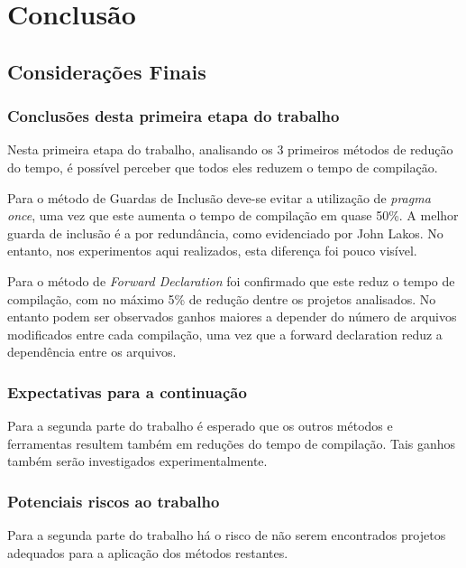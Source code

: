 \part{Conclusão}

\chapter[Considerações Finais]{Considerações Finais}

\section{Conclusões desta primeira etapa do trabalho}

Nesta primeira etapa do trabalho, analisando os 3 primeiros
 métodos de redução do tempo, é possível perceber que todos
 eles reduzem o tempo de compilação.

Para o método de Guardas de Inclusão deve-se evitar a
 utilização de \textit{pragma once}, uma vez que este aumenta
 o tempo de compilação em quase 50\%. A melhor guarda
 de inclusão é a por redundância, como evidenciado por
 John Lakos. No entanto, nos experimentos aqui realizados,
 esta diferença foi pouco visível.

Para o método de \textit{Forward Declaration} foi confirmado que
 este reduz o tempo de compilação, com no máximo 5\% de redução
 dentre os projetos analisados. No entanto podem ser observados
 ganhos maiores a depender do número de arquivos modificados
 entre cada compilação, uma vez que a forward declaration
 reduz a dependência entre os  arquivos.

\section{Expectativas para a continuação}

Para a segunda parte do trabalho é esperado que os
 outros métodos e ferramentas resultem também em
 reduções do tempo de compilação. Tais ganhos
 também serão investigados experimentalmente.  

\section{Potenciais riscos ao trabalho}

Para a segunda parte do trabalho há o risco de não 
serem encontrados projetos adequados para a aplicação
 dos métodos restantes.

